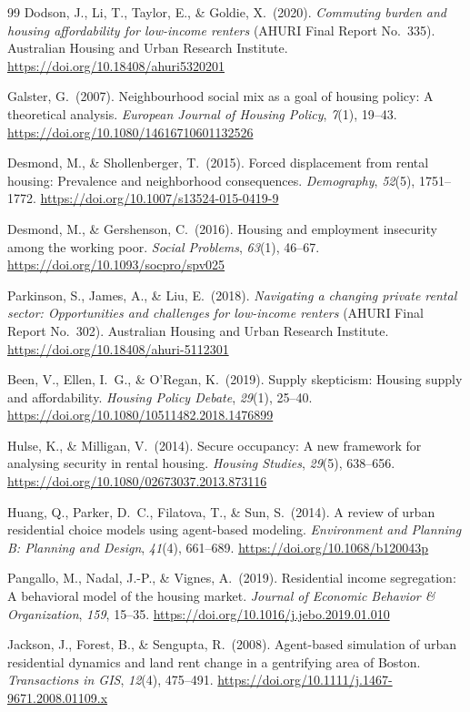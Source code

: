 \documentclass[10pt,a4paper]{article}
\begin{document}
\begin{thebibliography}{99}
Dodson, J., Li, T., Taylor, E., \& Goldie, X.\ (2020). \textit{Commuting burden and housing affordability for low-income renters} (AHURI Final Report No.\ 335). Australian Housing and Urban Research Institute.
\url{https://doi.org/10.18408/ahuri5320201}

Galster, G.\ (2007). Neighbourhood social mix as a goal of housing policy: A theoretical analysis.
\textit{European Journal of Housing Policy}, \textit{7}(1), 19--43.
\url{https://doi.org/10.1080/14616710601132526}

Desmond, M., \& Shollenberger, T.\ (2015). Forced displacement from rental housing: Prevalence and neighborhood consequences.
\textit{Demography}, \textit{52}(5), 1751--1772.
\url{https://doi.org/10.1007/s13524-015-0419-9}

Desmond, M., \& Gershenson, C.\ (2016). Housing and employment insecurity among the working poor.
\textit{Social Problems}, \textit{63}(1), 46--67.
\url{https://doi.org/10.1093/socpro/spv025}

Parkinson, S., James, A., \& Liu, E.\ (2018). \textit{Navigating a changing private rental sector: Opportunities and challenges for low-income renters} (AHURI Final Report No.\ 302). Australian Housing and Urban Research Institute.
\url{https://doi.org/10.18408/ahuri-5112301}

Been, V., Ellen, I.\ G., \& O'Regan, K.\ (2019). Supply skepticism: Housing supply and affordability.
\textit{Housing Policy Debate}, \textit{29}(1), 25--40.
\url{https://doi.org/10.1080/10511482.2018.1476899}

Hulse, K., \& Milligan, V.\ (2014). Secure occupancy: A new framework for analysing security in rental housing.
\textit{Housing Studies}, \textit{29}(5), 638--656.
\url{https://doi.org/10.1080/02673037.2013.873116}

Huang, Q., Parker, D.\ C., Filatova, T., \& Sun, S.\ (2014). A review of urban residential choice models using agent-based modeling.
\textit{Environment and Planning B: Planning and Design}, \textit{41}(4), 661--689.
\url{https://doi.org/10.1068/b120043p}

Pangallo, M., Nadal, J.-P., \& Vignes, A.\ (2019). Residential income segregation: A behavioral model of the housing market.
\textit{Journal of Economic Behavior \& Organization}, \textit{159}, 15--35.
\url{https://doi.org/10.1016/j.jebo.2019.01.010}

Jackson, J., Forest, B., \& Sengupta, R.\ (2008). Agent-based simulation of urban residential dynamics and land rent change in a gentrifying area of Boston.
\textit{Transactions in GIS}, \textit{12}(4), 475--491.
\url{https://doi.org/10.1111/j.1467-9671.2008.01109.x}


\end{thebibliography}
\end{document}

